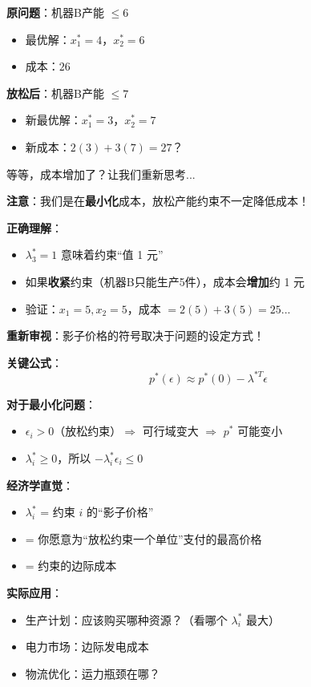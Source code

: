 \documentclass[12pt, a4paper]{ctexart}
\begin{document}
\begin{blackboard}[验证：放松约束后重新求解]

\textbf{原问题}：机器B产能 $\leq 6$
\begin{itemize}
    \item 最优解：$x_1^* = 4$，$x_2^* = 6$
    \item 成本：$26$
\end{itemize}

\textbf{放松后}：机器B产能 $\leq 7$
\begin{itemize}
    \item 新最优解：$x_1^* = 3$，$x_2^* = 7$
    \item 新成本：$2(3) + 3(7) = 27$？
\end{itemize}

等等，成本增加了？让我们重新思考...

\textbf{注意}：我们是在\textbf{最小化}成本，放松产能约束不一定降低成本！

\textbf{正确理解}：
\begin{itemize}
    \item $\lambda_3^* = 1$ 意味着约束``值 1 元''
    \item 如果\textbf{收紧}约束（机器B只能生产5件），成本会\textbf{增加}约 1 元
    \item 验证：$x_1 = 5, x_2 = 5$，成本 $= 2(5) + 3(5) = 25$... 
\end{itemize}

\textbf{重新审视}：影子价格的符号取决于问题的设定方式！

\end{blackboard}

\begin{blackboard}[影子价格的正确理解]

\textbf{关键公式}：
\[
p^*(\epsilon) \approx p^*(0) - \lambda^{*T} \epsilon
\]

\textbf{对于最小化问题}：
\begin{itemize}
    \item $\epsilon_i > 0$（放松约束）$\Rightarrow$ 可行域变大 $\Rightarrow$ $p^*$ 可能变小
    \item $\lambda_i^* \geq 0$，所以 $-\lambda_i^* \epsilon_i \leq 0$
\end{itemize}

\textbf{经济学直觉}：
\begin{itemize}
    \item $\lambda_i^*$ = 约束 $i$ 的``影子价格''
    \item = 你愿意为``放松约束一个单位''支付的最高价格
    \item = 约束的边际成本
\end{itemize}

\textbf{实际应用}：
\begin{itemize}
    \item 生产计划：应该购买哪种资源？（看哪个 $\lambda_i^*$ 最大）
    \item 电力市场：边际发电成本
    \item 物流优化：运力瓶颈在哪？
\end{itemize}

\end{blackboard}
\end{document}

